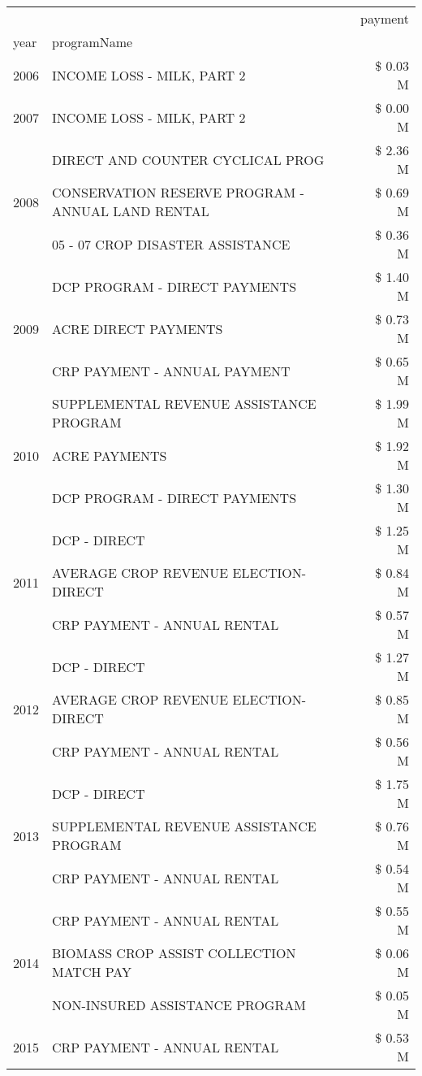 \begin{tabular}{llr}
\toprule
 &  & payment \\
year & programName &  \\
\midrule
2006 & INCOME LOSS - MILK, PART 2 & \$ 0.03 M \\
\cline{1-3}
2007 & INCOME LOSS - MILK, PART 2 & \$ 0.00 M \\
\cline{1-3}
\multirow[t]{3}{*}{2008} & DIRECT AND COUNTER CYCLICAL PROG & \$ 2.36 M \\
 & CONSERVATION RESERVE PROGRAM - ANNUAL LAND RENTAL & \$ 0.69 M \\
 & 05 - 07 CROP DISASTER ASSISTANCE & \$ 0.36 M \\
\cline{1-3}
\multirow[t]{3}{*}{2009} & DCP PROGRAM - DIRECT PAYMENTS & \$ 1.40 M \\
 & ACRE DIRECT PAYMENTS & \$ 0.73 M \\
 & CRP PAYMENT - ANNUAL PAYMENT & \$ 0.65 M \\
\cline{1-3}
\multirow[t]{3}{*}{2010} & SUPPLEMENTAL REVENUE ASSISTANCE PROGRAM & \$ 1.99 M \\
 & ACRE PAYMENTS & \$ 1.92 M \\
 & DCP PROGRAM - DIRECT PAYMENTS & \$ 1.30 M \\
\cline{1-3}
\multirow[t]{3}{*}{2011} & DCP - DIRECT & \$ 1.25 M \\
 & AVERAGE CROP REVENUE ELECTION-DIRECT & \$ 0.84 M \\
 & CRP PAYMENT - ANNUAL RENTAL & \$ 0.57 M \\
\cline{1-3}
\multirow[t]{3}{*}{2012} & DCP - DIRECT & \$ 1.27 M \\
 & AVERAGE CROP REVENUE ELECTION-DIRECT & \$ 0.85 M \\
 & CRP PAYMENT - ANNUAL RENTAL & \$ 0.56 M \\
\cline{1-3}
\multirow[t]{3}{*}{2013} & DCP - DIRECT & \$ 1.75 M \\
 & SUPPLEMENTAL REVENUE ASSISTANCE PROGRAM & \$ 0.76 M \\
 & CRP PAYMENT - ANNUAL RENTAL & \$ 0.54 M \\
\cline{1-3}
\multirow[t]{3}{*}{2014} & CRP PAYMENT - ANNUAL RENTAL & \$ 0.55 M \\
 & BIOMASS CROP ASSIST COLLECTION MATCH PAY & \$ 0.06 M \\
 & NON-INSURED ASSISTANCE PROGRAM & \$ 0.05 M \\
\cline{1-3}
\multirow[t]{3}{*}{2015} & CRP PAYMENT - ANNUAL RENTAL & \$ 0.53 M \\

\end{tabular}
